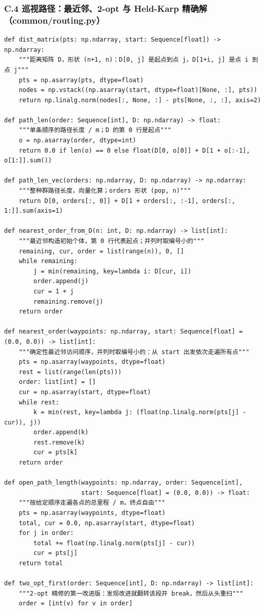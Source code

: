\documentclass[UTF8, zihao=5,AutoFakeBold=2]{ctexart}
\begin{document}
	\subsubsection*{C.4 \quad 巡视路径：最近邻、2-opt 与 Held-Karp 精确解（common/routing.py）}
	\begin{lstlisting}
def dist_matrix(pts: np.ndarray, start: Sequence[float]) -> np.ndarray:
    """距离矩阵 D，形状 (n+1, n)：D[0, j] 是起点到点 j，D[1+i, j] 是点 i 到点 j"""
    pts = np.asarray(pts, dtype=float)
    nodes = np.vstack((np.asarray(start, dtype=float)[None, :], pts))
    return np.linalg.norm(nodes[:, None, :] - pts[None, :, :], axis=2)

def path_len(order: Sequence[int], D: np.ndarray) -> float:
    """单条顺序的路径长度 / m；D 的第 0 行是起点"""
    o = np.asarray(order, dtype=int)
    return 0.0 if len(o) == 0 else float(D[0, o[0]] + D[1 + o[:-1], o[1:]].sum())

def path_len_vec(orders: np.ndarray, D: np.ndarray) -> np.ndarray:
    """整种群路径长度，向量化算；orders 形状 (pop, n)"""
    return D[0, orders[:, 0]] + D[1 + orders[:, :-1], orders[:, 1:]].sum(axis=1)

def nearest_order_from_D(n: int, D: np.ndarray) -> list[int]:
    """最近邻构造初始个体，第 0 行代表起点；并列时取编号小的"""
    remaining, cur, order = list(range(n)), 0, []
    while remaining:
        j = min(remaining, key=lambda i: D[cur, i])
        order.append(j)
        cur = 1 + j
        remaining.remove(j)
    return order

def nearest_order(waypoints: np.ndarray, start: Sequence[float] = (0.0, 0.0)) -> list[int]:
    """确定性最近邻访问顺序，并列时取编号小的：从 start 出发依次走遍所有点"""
    pts = np.asarray(waypoints, dtype=float)
    rest = list(range(len(pts)))
    order: list[int] = []
    cur = np.asarray(start, dtype=float)
    while rest:
        k = min(rest, key=lambda j: (float(np.linalg.norm(pts[j] - cur)), j))
        order.append(k)
        rest.remove(k)
        cur = pts[k]
    return order

def open_path_length(waypoints: np.ndarray, order: Sequence[int],
                     start: Sequence[float] = (0.0, 0.0)) -> float:
    """按给定顺序走遍各点的总里程 / m，终点自由"""
    pts = np.asarray(waypoints, dtype=float)
    total, cur = 0.0, np.asarray(start, dtype=float)
    for j in order:
        total += float(np.linalg.norm(pts[j] - cur))
        cur = pts[j]
    return total

def two_opt_first(order: Sequence[int], D: np.ndarray) -> list[int]:
    """2-opt 精修的第一改进版：发现改进就翻转该段并 break，然后从头重扫"""
    order = [int(v) for v in order]


\end{lstlisting}
\end{document}
